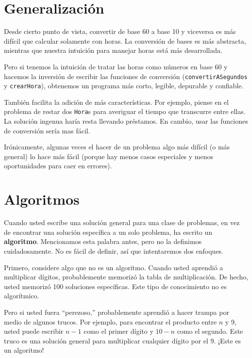 \section{Generalización}

Desde cierto punto de vista, convertir de base 60
a base 10 y viceversa es más difícil que calcular
solamente con horas. La conversión de bases es más
abstracta, mientras que nuestra intuición para 
manejar horas está más desarrollada.

Pero si tenemos la intuición de tratar las horas como
números en base 60 y hacemos la inversión de escribir
las funciones de conversión  ({\tt convertirASegundos} y 
\texttt{crearHora}), obtenemos un programa más corto,
legible, depurable y confiable.

También facilita la adición de más características. Por
ejemplo, piense en el problema de restar dos  \texttt{Hora}s para
averiguar el tiempo que transcurre entre ellas.  La solución
ingenua haría resta llevando préstamos. En cambio, usar las
funciones de conversión sería mas fácil.

Irónicamente, algunas veces el hacer de un problema algo
más difícil (o más general) lo hace más fácil (porque
hay menos casos especiales y menos oportunidades para
caer en errores).


\section{Algoritmos}

Cuando usted escribe una solución general para una clase de problemas,
en vez de encontrar una solución específica a un solo problema, ha
escrito un  {\bf algoritmo}. Mencionamos esta palabra antes, pero no 
la definimos cuidadosamente. No es fácil de definir, así que intentaremos
dos enfoques.

Primero, considere algo que no es un algoritmo. Cuando usted aprendió 
a multiplicar dígitos, probablemente memorizó la tabla de multiplicación.
De hecho, usted memorizó 100 soluciones específicas. Este tipo de conocimiento
no es algorítmico.

Pero si usted fuera ``perezoso,'' probablemente aprendió a hacer trampa
por medio de algunos trucos. Por ejemplo, para encontrar el producto entre
$n$ y 9, usted puede escribir  $n-1$ como el primer dígito y $10-n$ como el 
segundo. Este truco es una solución general para multiplicar cualquier 
dígito por el 9. ¡Este es un algoritmo!

